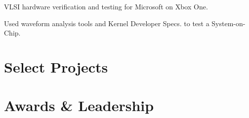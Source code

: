 \documentclass[]{_deedy-resume}
\begin{document}
\begin{minipage}[t]{0.66\textwidth}
\vspace{0.3cm}
\begin{tightemize}
\item VLSI hardware verification and testing for Microsoft on Xbox One.
\item Used waveform analysis tools and Kernel Developer Specs. to test a System-on-Chip.
\end{tightemize}
\sectionsep


\section{Select Projects}

\sectionsep


\section{Awards \& Leadership}
\begin{tabular}{rll}
\end{tabular}
\sectionsep


\end{minipage}
\end{document}

